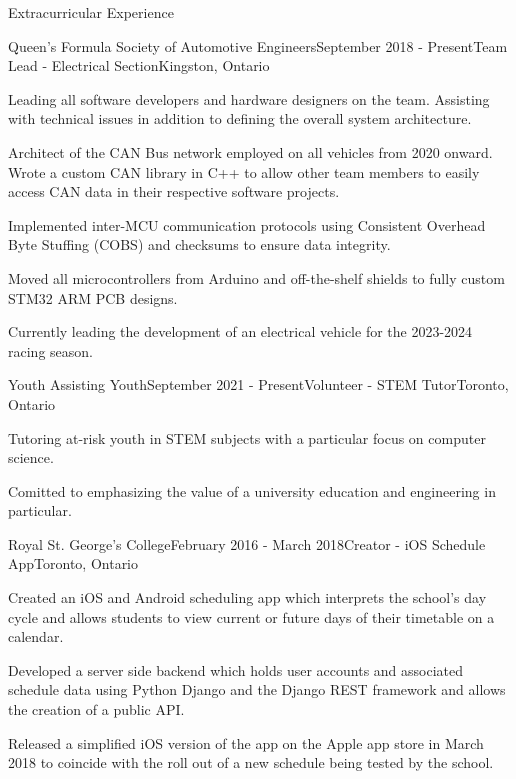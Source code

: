 \documentclass{resume} %
\begin{document}

\begin{rSection}{Extracurricular Experience}


\begin{rSubsection}{Queen's Formula Society of Automotive Engineers}{September 2018 - Present}{Team Lead - Electrical Section}{Kingston, Ontario}
\item Leading all software developers and hardware designers on the team. Assisting with technical issues in addition to defining the overall system architecture.
\item Architect of the CAN Bus network employed on all vehicles from 2020 onward. Wrote a
  custom CAN library in C++ to allow other team members to easily access CAN
  data in their respective software projects.
\item Implemented inter-MCU communication protocols using Consistent Overhead Byte Stuffing (COBS) and checksums to ensure data integrity.
\item Moved all microcontrollers from Arduino and off-the-shelf shields to fully custom STM32 ARM PCB designs.
\item Currently leading the development of an electrical vehicle for the 2023-2024 racing season.

\end{rSubsection}

\begin{rSubsection}{Youth Assisting Youth}{September 2021 - Present}{Volunteer - STEM Tutor}{Toronto, Ontario}
\item Tutoring at-risk youth in STEM subjects with a particular focus on computer science.
\item Comitted to emphasizing the value of a university education and engineering in particular.
\end{rSubsection}

\begin{rSubsection}{Royal St. George's College}{February 2016 - March
    2018}{Creator - iOS Schedule App}{Toronto, Ontario}
\item Created an iOS and Android scheduling app which interprets the school’s day cycle and
  allows students to view current or future days of their timetable on a calendar.
\item Developed a server side backend which holds user accounts and associated schedule data
  using Python Django and the Django REST framework and allows the creation of a public
  API.
\item Released a simplified iOS version of the app on the Apple app store in March 2018 to
  coincide with the roll out of a new schedule being tested by the school.


\end{rSubsection}
\end{rSection}
\end{document}

